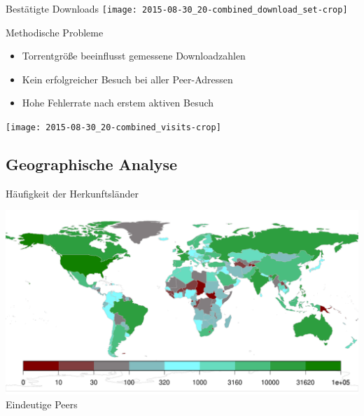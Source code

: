 \documentclass[dvipsnames]{beamer} %
\begin{document}
	\begin{frame}{Bestätigte Downloads}
    \texttt{[image: 2015-08-30\_20-combined\_download\_set-crop]}
	\end{frame}

	\begin{frame}{Methodische Probleme}
		\begin{itemize}
			\item Torrentgröße beeinflusst gemessene Downloadzahlen
			\item Kein erfolgreicher Besuch bei  aller Peer-Adressen
			\item Hohe Fehlerrate nach erstem aktiven Besuch
		\end{itemize}

		\vspace{0.7cm}
    \texttt{[image: 2015-08-30\_20-combined\_visits-crop]}
	\end{frame}

	\subsection{Geographische Analyse}
	\begin{frame}{Häufigkeit der Herkunftsländer}
		\begin{center}
	    \includegraphics[width=\textwidth]{../result/2015-08-30_20-combined_location_map}\\
	    {\small Eindeutige Peers}
	  \end{center}
	\end{frame}
\end{document}
